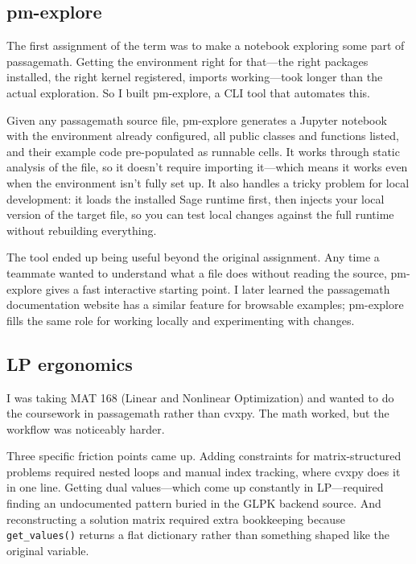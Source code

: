 \documentclass[10pt]{article}
\begin{document}
\subsection{pm-explore}

The first assignment of the term was to make a notebook exploring some part of passagemath.
Getting the environment right for that---the right packages installed, the right kernel
registered, imports working---took longer than the actual exploration. So I built pm-explore, a
CLI tool that automates this.

Given any passagemath source file, pm-explore generates a Jupyter notebook with the environment
already configured, all public classes and functions listed, and their example code pre-populated
as runnable cells. It works through static analysis of the file, so it doesn't require importing
it---which means it works even when the environment isn't fully set up. It also handles a tricky
problem for local development: it loads the installed Sage runtime first, then injects your local
version of the target file, so you can test local changes against the full runtime without
rebuilding everything.

The tool ended up being useful beyond the original assignment. Any time a teammate wanted to
understand what a file does without reading the source, pm-explore gives a fast interactive
starting point. I later learned the passagemath documentation website has a similar feature for
browsable examples; pm-explore fills the same role for working locally and experimenting with
changes.

\subsection{LP ergonomics}
\label{sec:lp}

I was taking MAT 168 (Linear and Nonlinear Optimization) and wanted to do the coursework in
passagemath rather than cvxpy. The math worked, but the workflow was noticeably harder.

Three specific friction points came up. Adding constraints for matrix-structured problems
required nested loops and manual index tracking, where cvxpy does it in one line. Getting dual
values---which come up constantly in LP---required finding an undocumented pattern buried in the
GLPK backend source. And reconstructing a solution matrix required extra bookkeeping because
\texttt{get\_values()} returns a flat dictionary rather than something shaped like the original
variable.
\end{document}
